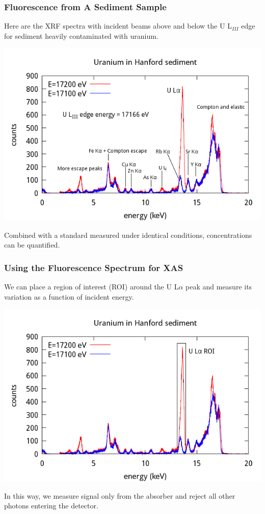 \documentclass[10pt, xcolor=x11names, compress, handout]{beamer}
\begin{document}
\begin{frame}
  \frametitle{Fluorescence from A Sediment Sample}
  \begin{center}
    Here are the XRF spectra with incident beams \alert{above} and
    {\color{Blue4}below} the U L$_{III}$ edge for sediment heavily
    contaminated with uranium.

    \includegraphics[width=0.7\linewidth]{xrf/xrf.png}
  \end{center}

  \begin{exampleblock}{}
    \begin{center}
      Combined with a standard measured under identical conditions,
      concentrations can be quantified.
    \end{center}
  \end{exampleblock}
\end{frame}
\begin{frame}
  \frametitle{Using the Fluorescence Spectrum for XAS}
  \begin{center}
    We can place a \alert{region of interest} (ROI) around the U
    L$\alpha$ peak and measure its variation as a function of incident
    energy.

    \includegraphics[width=0.7\linewidth]{xrf/roi.png}
  \end{center}

  \begin{exampleblock}{}
    \begin{center}
      In this way, we measure signal only from the absorber and reject
      all other photons entering the detector.
    \end{center}
  \end{exampleblock}
\end{frame}
\end{document}
